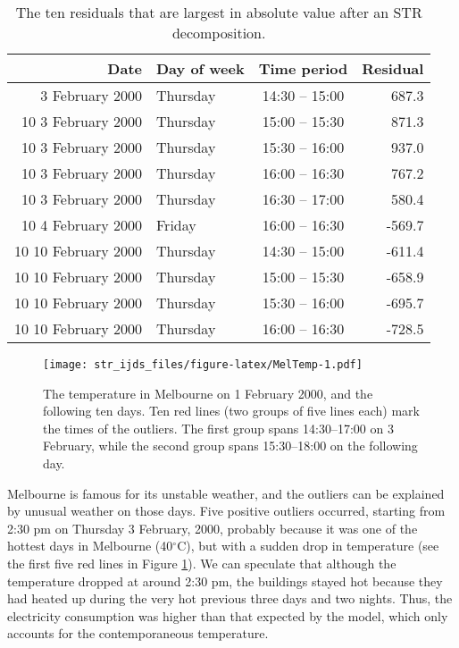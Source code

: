 \documentclass[11pt,a4paper,]{article}
\begin{document}
\begin{table}[!bh]

\caption{\label{tab:outlierstable}The ten residuals that are largest in absolute value after an STR decomposition.}
\centering
\begin{tabular}[t]{rlcr}
\toprule
Date & Day of week & Time period & Residual\\
\midrule
3 February 2000 & Thursday & 14:30 -- 15:00 & 687.3\\
10
3 February 2000 & Thursday & 15:00 -- 15:30 & 871.3\\
10
3 February 2000 & Thursday & 15:30 -- 16:00 & 937.0\\
10
3 February 2000 & Thursday & 16:00 -- 16:30 & 767.2\\
10
3 February 2000 & Thursday & 16:30 -- 17:00 & 580.4\\
10
4 February 2000 & Friday & 16:00 -- 16:30 & -569.7\\
10
10 February 2000 & Thursday & 14:30 -- 15:00 & -611.4\\
10
10 February 2000 & Thursday & 15:00 -- 15:30 & -658.9\\
10
10 February 2000 & Thursday & 15:30 -- 16:00 & -695.7\\
10
10 February 2000 & Thursday & 16:00 -- 16:30 & -728.5\\
\bottomrule
\end{tabular}
\end{table}

\begin{figure}
\centering
\texttt{[image: str\_ijds\_files/figure-latex/MelTemp-1.pdf]}
\caption{\label{fig:MelTemp}The temperature in Melbourne on 1 February 2000, and the following ten days. Ten red lines (two groups of five lines each) mark the times of the outliers. The first group spans 14:30--17:00 on 3 February, while the second group spans 15:30--18:00 on the following day.}
\end{figure}

Melbourne is famous for its unstable weather, and the outliers can be explained by unusual weather on those days.
Five positive outliers occurred, starting from 2:30 pm on Thursday 3 February, 2000, probably because it was one of the hottest days in Melbourne (40\(^{\circ}\)C), but with a sudden drop in temperature (see the first five red lines in Figure \ref{fig:MelTemp}). We can speculate that although the temperature dropped at around 2:30 pm, the buildings stayed hot because they had heated up during the very hot previous three days and two nights. Thus, the electricity consumption was higher than that expected by the model, which only accounts for the contemporaneous temperature.
\end{document}
